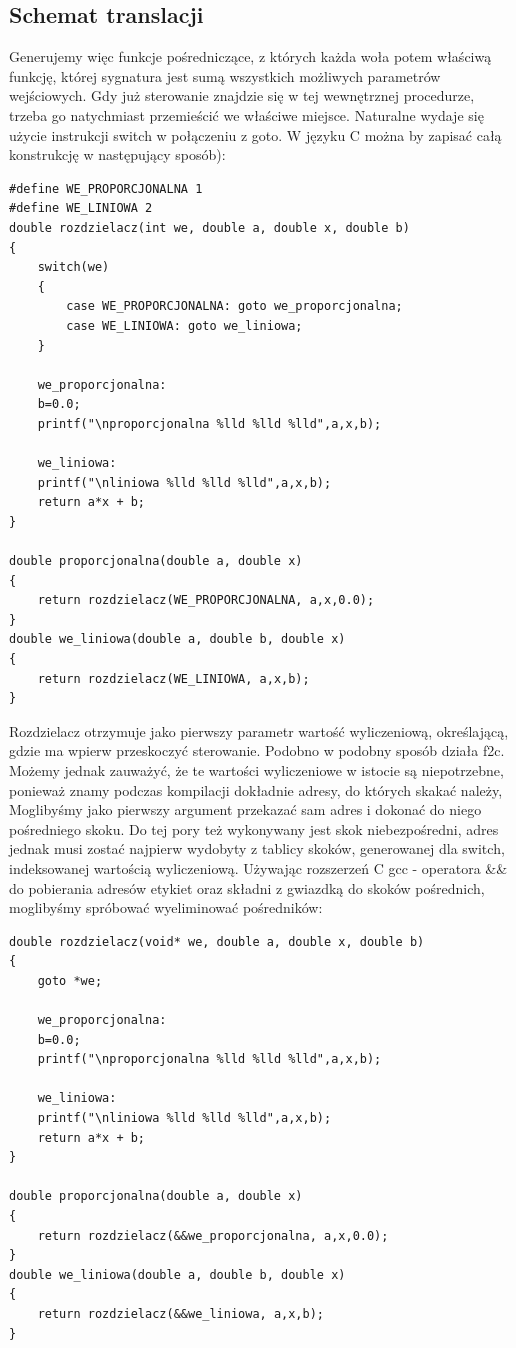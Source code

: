\subsection{Schemat translacji}
Generujemy więc funkcje pośredniczące, z których każda woła potem właściwą funkcję, której sygnatura jest sumą wszystkich możliwych parametrów wejściowych. Gdy już sterowanie znajdzie się w tej wewnętrznej procedurze, trzeba go natychmiast przemieścić we właściwe miejsce. Naturalne wydaje się użycie instrukcji switch w połączeniu z goto. W języku C można by zapisać całą konstrukcję w następujący sposób):
\begin{lstlisting}
#define WE_PROPORCJONALNA 1
#define WE_LINIOWA 2
double rozdzielacz(int we, double a, double x, double b)
{
	switch(we)
	{
    	case WE_PROPORCJONALNA: goto we_proporcjonalna;
    	case WE_LINIOWA: goto we_liniowa;
	}
    
	we_proporcjonalna:
	b=0.0;
	printf("\nproporcjonalna %lld %lld %lld",a,x,b);
    
	we_liniowa:
	printf("\nliniowa %lld %lld %lld",a,x,b);
	return a*x + b;
}

double proporcjonalna(double a, double x)
{
	return rozdzielacz(WE_PROPORCJONALNA, a,x,0.0);
}
double we_liniowa(double a, double b, double x)
{
	return rozdzielacz(WE_LINIOWA, a,x,b);
}
\end{lstlisting}
Rozdzielacz otrzymuje jako pierwszy parametr wartość wyliczeniową, określającą, gdzie ma wpierw przeskoczyć sterowanie.
Podobno w podobny sposób działa f2c.\cite{gpp_entry_points} Możemy jednak zauważyć, że te wartości wyliczeniowe w istocie są niepotrzebne, ponieważ znamy podczas kompilacji dokładnie adresy, do których skakać należy, Moglibyśmy jako pierwszy argument przekazać sam adres i dokonać do niego pośredniego skoku. Do tej pory też wykonywany jest skok niebezpośredni, adres jednak musi zostać najpierw wydobyty z tablicy skoków, generowanej dla switch, indeksowanej wartością wyliczeniową. Używając rozszerzeń C gcc - operatora \&\& do pobierania adresów etykiet oraz składni z gwiazdką do skoków pośrednich, moglibyśmy spróbować wyeliminować pośredników:
\begin{lstlisting}
double rozdzielacz(void* we, double a, double x, double b)
{
	goto *we;
    
	we_proporcjonalna:
	b=0.0;
	printf("\nproporcjonalna %lld %lld %lld",a,x,b);

	we_liniowa:
	printf("\nliniowa %lld %lld %lld",a,x,b);
	return a*x + b;
}

double proporcjonalna(double a, double x)
{
	return rozdzielacz(&&we_proporcjonalna, a,x,0.0);
}
double we_liniowa(double a, double b, double x)
{
	return rozdzielacz(&&we_liniowa, a,x,b);
}
\end{lstlisting}
